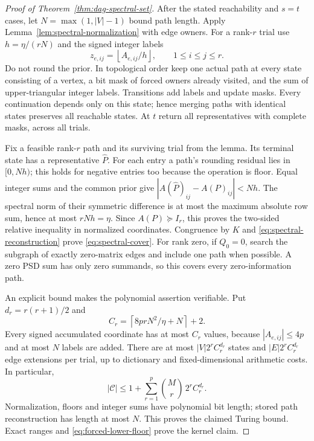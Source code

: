 \begin{proof}[Proof of Theorem~\ref{thm:dag-spectral-set}]
After the stated reachability and $s=t$ cases, let $N=\max(1,|V|-1)$ bound
path length. Apply Lemma~\ref{lem:spectral-normalization} with edge owners.
For a rank-$r$ trial use $h=\eta/(rN)$ and the signed integer labels
\begin{equation}
 z_{e,ij}=\left\lfloor A_{e,ij}/h\right\rfloor,
 \qquad 1\le i\le j\le r.
 \label{eq:signed-profile}
\end{equation}
Do not round the prior. In topological order keep one actual path at every
state consisting of a vertex, a bit mask of forced owners already visited,
and the sum of upper-triangular integer labels. Transitions add labels and
update masks. Every continuation depends only on this state; hence merging
paths with identical states preserves all reachable states. At $t$ return
all representatives with complete masks, across all trials.

Fix a feasible rank-$r$ path and its surviving trial from the lemma. Its
terminal state has a representative $\widehat P$. For each entry a path's
rounding residual lies in $[0,Nh)$; this holds for negative entries too
because the operation is floor. Equal integer sums and the common prior give
$|A(\widehat P)_{ij}-A(P)_{ij}|<Nh$. The spectral norm of their symmetric
difference is at most the maximum absolute row sum, hence at most
$rNh=\eta$. Since $A(P)\succeq I_r$, this proves the two-sided relative
inequality in normalized coordinates. Congruence by $K$ and
\eqref{eq:spectral-reconstruction} prove \eqref{eq:spectral-cover}.
For rank zero, if $Q_0=0$, search the subgraph of exactly zero-matrix edges
and include one path when possible. A zero PSD sum has only zero summands,
so this covers every zero-information path.

An explicit bound makes the polynomial assertion verifiable. Put
$d_r=r(r+1)/2$ and
\[
 C_r=\left\lceil8prN^2/\eta+N\right\rceil+2.
\]
Every signed accumulated coordinate has at most $C_r$ values, because
$|A_{e,ij}|\le4p$ and at most $N$ labels are added. There are at most
$|V|2^rC_r^{d_r}$ states and $|E|2^rC_r^{d_r}$ edge extensions per trial,
up to dictionary and fixed-dimensional arithmetic costs. In particular,
\begin{equation}
 |\mathcal C|\le1+\sum_{r=1}^p\binom Mr\,2^rC_r^{d_r}.
 \label{eq:dag-cover-size}
\end{equation}
Normalization, floors and integer sums have polynomial bit length; stored
path reconstruction has length at most $N$. This proves the claimed Turing
bound. Exact ranges and \eqref{eq:forced-lower-floor} prove the kernel claim.
\end{proof}

